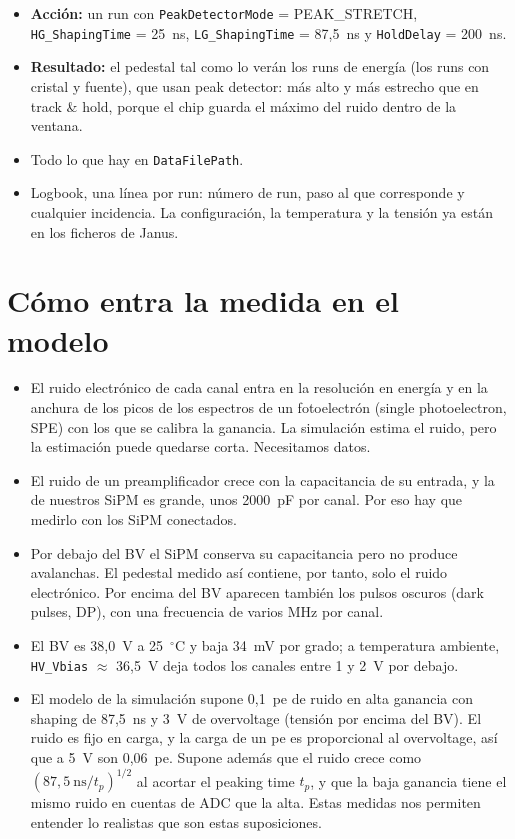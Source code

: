 \documentclass[11pt,a4paper]{article}
\begin{document}
\begin{itemize}
\item {\bf Acción:} un run con \texttt{PeakDetectorMode} = PEAK\_STRETCH,
  \texttt{HG\_ShapingTime} = 25~ns, \texttt{LG\_ShapingTime} = 87,5~ns y
  \texttt{HoldDelay} = 200~ns.
\item {\bf Resultado:} el pedestal tal como lo verán los runs de energía
  (los runs con cristal y fuente), que usan peak detector: más alto y más estrecho que en track \& hold,
  porque el chip guarda el máximo del ruido dentro de la ventana.
\end{itemize}

\begin{itemize}
\item Todo lo que hay en \texttt{DataFilePath}.
\item Logbook, una línea por run: número de run, paso al que
  corresponde y cualquier incidencia. La configuración, la temperatura y
  la tensión ya están en los ficheros de Janus.
\end{itemize}

\section{Cómo entra la medida en el modelo}
\label{sec:razon}

\begin{itemize}
\item El ruido electrónico de cada canal entra en la resolución en energía y
  en la anchura de los picos de los espectros de un fotoelectrón (single
  photoelectron, SPE) con los que se calibra la ganancia. La simulación
  estima el ruido, pero la estimación puede quedarse corta. Necesitamos datos. 
\item El ruido de un preamplificador crece con la capacitancia de su
  entrada, y la de nuestros SiPM es grande, unos 2000~pF por canal. Por eso hay que medirlo con los SiPM conectados.
\item Por debajo del BV el SiPM conserva su capacitancia
  pero no produce avalanchas. El pedestal medido así
  contiene, por tanto, solo el ruido electrónico. Por encima del BV aparecen también
  los pulsos oscuros (dark pulses, DP), con una frecuencia de varios MHz por canal.
\item El BV es 38,0~V a 25~$^\circ$C y baja 34~mV por
  grado; a temperatura ambiente, \texttt{HV\_Vbias} $\approx$ 36,5~V deja todos
  los canales entre 1 y 2~V por debajo. 
  \item El modelo de la simulación supone 0,1~pe de ruido en alta ganancia
  con shaping de 87,5~ns y 3~V de overvoltage (tensión por encima del BV).
  El ruido es fijo en carga, y la carga de un pe es proporcional al
  overvoltage, así que a 5~V son 0,06~pe. Supone además que el ruido crece como $(87{,}5~\mathrm{ns}/t_p)^{1/2}$
  al acortar el peaking time $t_p$, y que la baja ganancia tiene el mismo
  ruido en cuentas de ADC que la alta. Estas medidas nos permiten entender lo realistas que son estas suposiciones.
\end{itemize}
\end{document}
